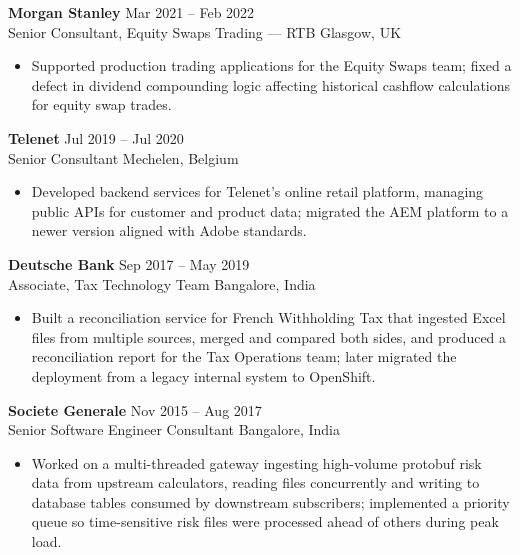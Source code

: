\documentclass[a4paper,9pt]{article}
\begin{document}
\textbf{Morgan Stanley} \hfill Mar 2021 -- Feb 2022 \\
{\color{navy}Senior Consultant, Equity Swaps Trading --- RTB} \hfill Glasgow, UK \vspace{-5pt}\\
\begin{itemize}[left=0pt, label=\textbullet, itemsep=0pt, parsep=0pt, topsep=0pt, partopsep=0pt]
    \item Supported production trading applications for the Equity Swaps team; fixed a defect in dividend compounding logic affecting historical cashflow calculations for equity swap trades.
\end{itemize}
\vspace{2pt}

\textbf{Telenet} \hfill Jul 2019 -- Jul 2020\\
{\color{navy}Senior Consultant} \hfill Mechelen, Belgium \vspace{-5pt}\\
\begin{itemize}[left=0pt, label=\textbullet, itemsep=0pt, parsep=0pt, topsep=0pt, partopsep=0pt]
    \item Developed backend services for Telenet's online retail platform, managing public APIs for customer and product data; migrated the AEM platform to a newer version aligned with Adobe standards.
\end{itemize}
\vspace{2pt}

\textbf{Deutsche Bank} \hfill Sep 2017 -- May 2019 \\
{\color{navy}Associate, Tax Technology Team} \hfill Bangalore, India \vspace{-5pt}\\
\begin{itemize}[left=0pt, label=\textbullet, itemsep=0pt, parsep=0pt, topsep=0pt, partopsep=0pt]
    \item Built a reconciliation service for French Withholding Tax that ingested Excel files from multiple sources, merged and compared both sides, and produced a reconciliation report for the Tax Operations team; later migrated the deployment from a legacy internal system to OpenShift.
\end{itemize}
\vspace{2pt}

\textbf{Societe Generale} \hfill Nov 2015 -- Aug 2017 \\
{\color{navy}Senior Software Engineer Consultant} \hfill Bangalore, India \vspace{-5pt}\\
\begin{itemize}[left=0pt, label=\textbullet, itemsep=0pt, parsep=0pt, topsep=0pt, partopsep=0pt]
    \item Worked on a multi-threaded gateway ingesting high-volume protobuf risk data from upstream calculators, reading files concurrently and writing to database tables consumed by downstream subscribers; implemented a priority queue so time-sensitive risk files were processed ahead of others during peak load.
\end{itemize}
\vspace{2pt}
\end{document}
